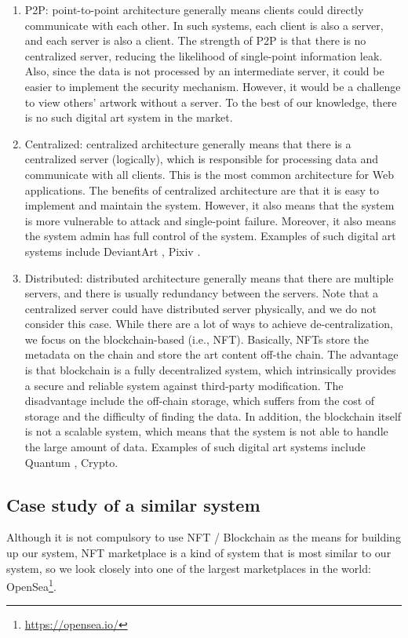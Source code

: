 \begin{enumerate}
\item P2P: point-to-point architecture generally means clients could directly communicate with each other. In such systems, each client is also a server, and each server is also a client. The strength of P2P is that there is no centralized server, reducing the likelihood of single-point information leak. Also, since the data is not processed by an intermediate server, it could be easier to implement the security mechanism. However, it would be a challenge to view others' artwork without a server. To the best of our knowledge, there is no such digital art system in the market.
\item Centralized: centralized architecture generally means that there is a centralized server (logically), which is responsible for processing data and communicate with all clients. This is the most common architecture for Web applications. The benefits of centralized architecture are that it is easy to implement and maintain the system. However, it also means that the system is more vulnerable to attack and single-point failure. Moreover, it also means the system admin has full control of the system. Examples of such digital art systems include DeviantArt \cite{deviantart}, Pixiv \cite{crypto}.

\item Distributed: distributed architecture generally means that there are multiple servers, and there is usually redundancy between the servers. Note that a centralized server could have distributed server physically, and we do not consider this case. While there are a lot of ways to achieve de-centralization, we focus on the blockchain-based (i.e., NFT). Basically, NFTs store the metadata on the chain and store the art content off-the chain. The advantage is that blockchain is a fully decentralized system, which intrinsically provides a secure and reliable system against third-party modification. The disadvantage include the off-chain storage, which suffers from the cost of storage and the difficulty of finding the data. In addition, the blockchain itself is not a scalable system, which means that the system is not able to handle the large amount of data. Examples of such digital art systems include Quantum \cite{quantum}, Crypto\cite{crypto}.

\end{enumerate}

\subsection{Case study of a similar system }
Although it is not compulsory to use NFT / Blockchain as the means for building up our system, NFT marketplace is a kind of system that is most similar to our system, so we look closely into one of the largest marketplaces in the world: OpenSea\footnote{\url{https://opensea.io/}}.

